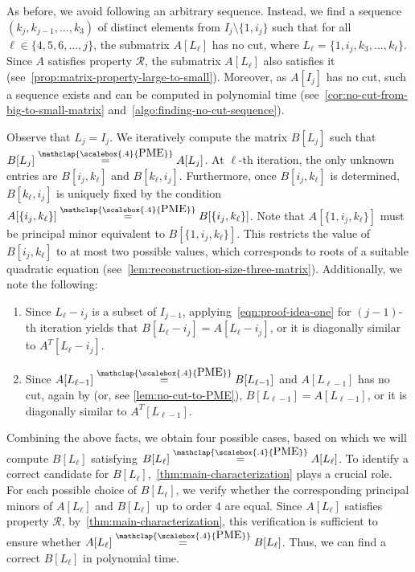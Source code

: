 \documentclass[11pt,letterpaper]{article}
\newcommand{\PME}{\stackrel{\mathclap{\scalebox{.4}{\mbox{PME}}}}{=}}
\newcommand{\prop}{\mathcal{R}}
\begin{document}
{{{As before, we avoid following an arbitrary sequence. Instead, we find a sequence $(k_j, k_{j-1}, \ldots, k_3)$ of distinct elements from $I_j\setminus\{1, i_j\}$ such that for all $\ell\in\{4,5,6,\ldots, j\}$, the submatrix $A[L_\ell]$  has no cut, where $L_\ell=\{1, i_j, k_3, \ldots, k_\ell\}$. Since $A$ satisfies property $\prop$, the submatrix $A[L_\ell]$ also satisfies it (see~\cref{prop:matrix-property-large-to-small}). Moreover,  as $A[I_j]$ has no cut, such a sequence exists and can be computed in polynomial time (see~\cref{cor:no-cut-from-big-to-small-matrix} and~\cref{algo:finding-no-cut-sequence}). 
 

 

Observe that $L_j=I_j$. We iteratively compute the matrix $B[L_j]$ such that $B[L_j]\PME A[L_j]$. At $\ell$-th iteration, the only unknown entries are $B[i_j, k_\ell]$ and $B[k_\ell, i_j]$.  Furthermore, once $B[i_j, k_\ell]$ is determined, $B[k_\ell, i_j]$ is uniquely fixed by the condition $A[\{i_j, k_\ell\}]\PME B[\{i_j, k_\ell\}]$. Note that $A[\{1, i_j, k_\ell\}]$ must be principal minor equivalent to $B[\{1, i_j, k_\ell\}]$. This restricts the value of $B[i_j, k_\ell]$  to at most two possible values, which corresponds to roots of a suitable quadratic equation (see~\cref{lem:reconstruction-size-three-matrix}). Additionally, we note the following:
\begin{enumerate}
\item Since $L_\ell-i_j$ is a subset of $I_{j-1}$, applying~\cref{eqn:proof-idea-one} for $(j-1)$-th iteration yields that $ B[L_\ell-i_j]=A[L_\ell-i_j]$, or it is diagonally similar to $A^T[L_\ell-i_j]$. 

\item Since $A[L_{\ell-1}]\PME B[L_{\ell-1}]$ and $A[L_{\ell-1}]$ has no cut, again by \cite[Theorem~1]{Loewy86} (or, see \cref{lem:no-cut-to-PME}), $ B[L_{\ell-1}]=A[L_{\ell-1}]$, or it is diagonally similar to $A^T[L_{\ell-1}]$.
\end{enumerate}
Combining the above facts, we obtain four possible cases, based on which we will compute $B[L_\ell]$ satisfying $B[L_\ell]\PME A[L_\ell]$. To identify a correct candidate for $B[L_\ell]$,~\cref{thm:main-characterization} plays a crucial role. For each possible choice of $B[L_\ell]$, we verify whether the corresponding principal minors of $A[L_\ell]$ and $B[L_\ell]$ up to order $4$ are equal. Since $A[L_\ell]$ satisfies property $\prop$, by~\cref{thm:main-characterization}, this verification is sufficient to ensure whether $A[L_\ell]\PME B[L_\ell]$. Thus, we can find a correct $B[L_\ell]$ in polynomial time. 

}}}
\end{document}
